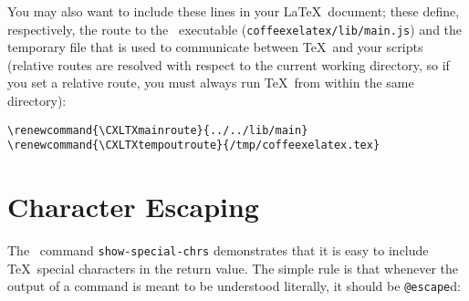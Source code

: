 You may also want to include these lines in your \LaTeX\ document; these define, respectively, the route
to the \CXLTX\ executable (\verb#coffeexelatex/lib/main.js#) and the temporary file that is used to communicate
between \TeX\ and your scripts (relative routes are resolved with respect to the current working directory,
so if you set a relative route, you must always run \TeX\ from within the same directory):
\begin{verbatim}
\renewcommand{\CXLTXmainroute}{../../lib/main}
\renewcommand{\CXLTXtempoutroute}{/tmp/coffeexelatex.tex}
\end{verbatim}










\clearpage\section{Character Escaping}\label{esc}

The \CXLTX\ command \verb#show-special-chrs# demonstrates that it is easy to include \TeX\ special characters
in the return value. The simple rule is that whenever the output of a command is meant to be understood
literally, it should be \verb#@escape#d:

